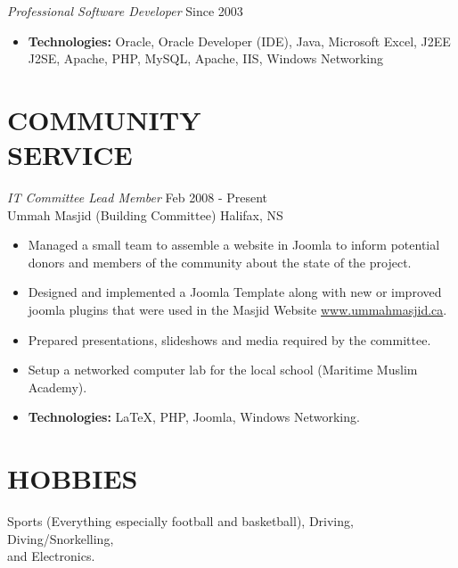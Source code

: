 \documentclass[line,margin]{res}
\begin{document}
\begin{resume}
    {\sl Professional Software Developer} \hfill Since 2003 \\
    \smallskip
        \begin{itemize}  \itemsep -2pt %
    \item {\bf Technologies:} \hspace{3pt}
        Oracle, Oracle Developer (IDE), Java, Microsoft Excel, J2EE \newline
        \hspace*{72pt} J2SE, Apache, PHP, MySQL, Apache, IIS, \newline
        \hspace*{72pt} Windows Networking
        \end{itemize}

\section{COMMUNITY \\ SERVICE}
    {\sl IT Committee Lead Member} \hfill Feb 2008 - Present \\
    Ummah Masjid (Building Committee) \hfill Halifax, NS \smallskip
        \begin{itemize}  \itemsep -2pt %
    \item Managed a small team to assemble a website in Joomla to inform
    potential donors and members of the community about the state of the
    project.
    \item Designed and implemented a Joomla Template along with new or
    improved joomla plugins that were used in the Masjid Website
    \href{http://www.ummahmasjid.ca}{www.ummahmasjid.ca}.
    \item Prepared presentations, slideshows and media
    required by the committee.
    \item Setup a networked computer lab for the local school (Maritime
    Muslim Academy).
    \item {\bf Technologies:} \hspace{1pt}
        LaTeX, PHP, Joomla, Windows Networking.
        \end{itemize}

\section{HOBBIES}
    Sports (Everything especially football and basketball), Driving,
    Diving/Snorkelling, \\ and Electronics.

\end{resume}
\end{document}
